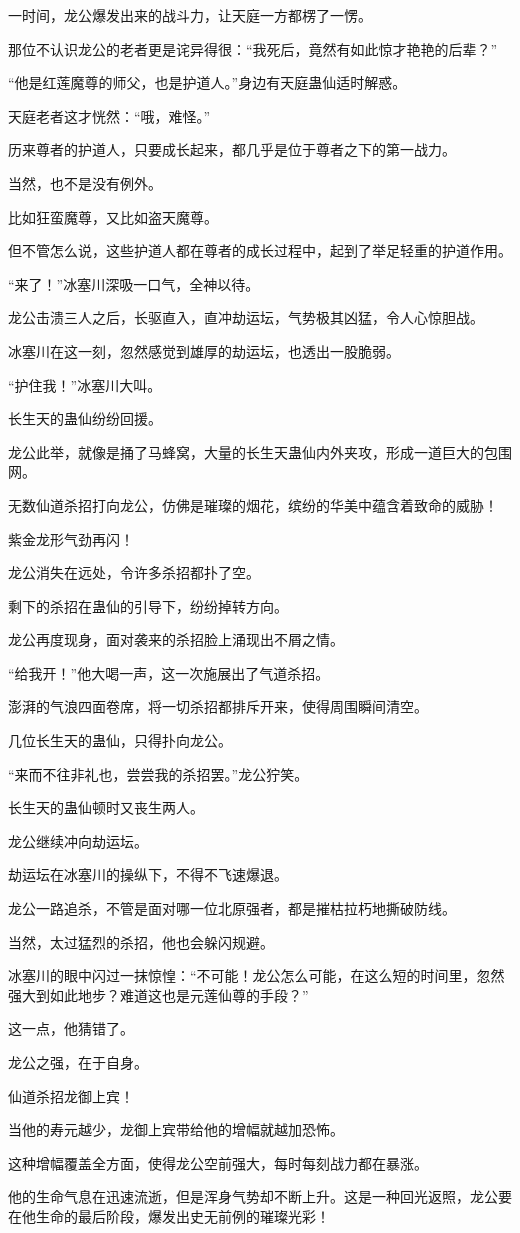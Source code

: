 \begin{this_body}
一时间，龙公爆发出来的战斗力，让天庭一方都楞了一愣。

那位不认识龙公的老者更是诧异得很：“我死后，竟然有如此惊才艳艳的后辈？”

“他是红莲魔尊的师父，也是护道人。”身边有天庭蛊仙适时解惑。

天庭老者这才恍然：“哦，难怪。”

历来尊者的护道人，只要成长起来，都几乎是位于尊者之下的第一战力。

当然，也不是没有例外。

比如狂蛮魔尊，又比如盗天魔尊。

但不管怎么说，这些护道人都在尊者的成长过程中，起到了举足轻重的护道作用。

“来了！”冰塞川深吸一口气，全神以待。

龙公击溃三人之后，长驱直入，直冲劫运坛，气势极其凶猛，令人心惊胆战。

冰塞川在这一刻，忽然感觉到雄厚的劫运坛，也透出一股脆弱。

“护住我！”冰塞川大叫。

长生天的蛊仙纷纷回援。

龙公此举，就像是捅了马蜂窝，大量的长生天蛊仙内外夹攻，形成一道巨大的包围网。

无数仙道杀招打向龙公，仿佛是璀璨的烟花，缤纷的华美中蕴含着致命的威胁！

紫金龙形气劲再闪！

龙公消失在远处，令许多杀招都扑了空。

剩下的杀招在蛊仙的引导下，纷纷掉转方向。

龙公再度现身，面对袭来的杀招脸上涌现出不屑之情。

“给我开！”他大喝一声，这一次施展出了气道杀招。

澎湃的气浪四面卷席，将一切杀招都排斥开来，使得周围瞬间清空。

几位长生天的蛊仙，只得扑向龙公。

“来而不往非礼也，尝尝我的杀招罢。”龙公狞笑。

长生天的蛊仙顿时又丧生两人。

龙公继续冲向劫运坛。

劫运坛在冰塞川的操纵下，不得不飞速爆退。

龙公一路追杀，不管是面对哪一位北原强者，都是摧枯拉朽地撕破防线。

当然，太过猛烈的杀招，他也会躲闪规避。

冰塞川的眼中闪过一抹惊惶：“不可能！龙公怎么可能，在这么短的时间里，忽然强大到如此地步？难道这也是元莲仙尊的手段？”

这一点，他猜错了。

龙公之强，在于自身。

仙道杀招龙御上宾！

当他的寿元越少，龙御上宾带给他的增幅就越加恐怖。

这种增幅覆盖全方面，使得龙公空前强大，每时每刻战力都在暴涨。

他的生命气息在迅速流逝，但是浑身气势却不断上升。这是一种回光返照，龙公要在他生命的最后阶段，爆发出史无前例的璀璨光彩！

\end{this_body}

